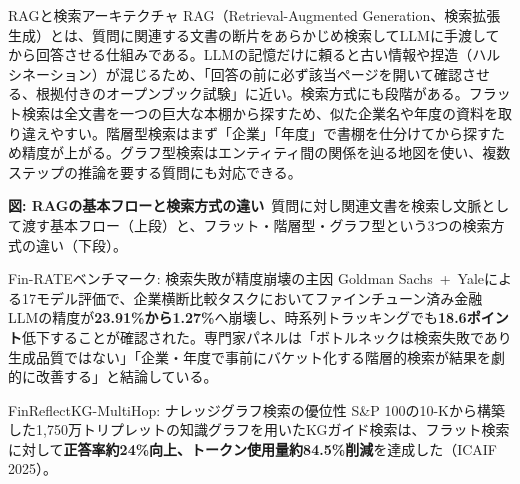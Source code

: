 \begin{concept}{RAGと検索アーキテクチャ}
RAG（Retrieval-Augmented Generation、検索拡張生成）とは、質問に関連する文書の断片をあらかじめ検索してLLMに手渡してから回答させる仕組みである。LLMの記憶だけに頼ると古い情報や捏造（ハルシネーション）が混じるため、「回答の前に必ず該当ページを開いて確認させる、根拠付きのオープンブック試験」に近い。検索方式にも段階がある。フラット検索は全文書を一つの巨大な本棚から探すため、似た企業名や年度の資料を取り違えやすい。階層型検索はまず「企業」「年度」で書棚を仕分けてから探すため精度が上がる。グラフ型検索はエンティティ間の関係を辿る地図を使い、複数ステップの推論を要する質問にも対応できる。
\begin{center}
\end{center}
{\small\color{brandgray}\textbf{図: RAGの基本フローと検索方式の違い}\ 質問に対し関連文書を検索し文脈として渡す基本フロー（上段）と、フラット・階層型・グラフ型という3つの検索方式の違い（下段）。}
\end{concept}

\begin{casestudy}{Fin-RATEベンチマーク: 検索失敗が精度崩壊の主因}
Goldman Sachs\ +\ Yaleによる17モデル評価で、企業横断比較タスクにおいてファインチューン済み金融LLMの精度が\textbf{23.91\%から1.27\%}へ崩壊し、時系列トラッキングでも\textbf{18.6ポイント}低下することが確認された。専門家パネルは「ボトルネックは検索失敗であり生成品質ではない」「企業・年度で事前にバケット化する階層的検索が結果を劇的に改善する」と結論している。\cite{finrate2026}
\end{casestudy}

\begin{casestudy}{FinReflectKG-MultiHop: ナレッジグラフ検索の優位性}
S\&P 100の10-Kから構築した1,750万トリプレットの知識グラフを用いたKGガイド検索は、フラット検索に対して\textbf{正答率約24\%向上、トークン使用量約84.5\%削減}を達成した（ICAIF 2025）。\cite{finreflectkg2025}
\end{casestudy}

